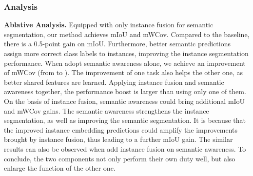 \documentclass[10pt,twocolumn,letterpaper]{article}
\newcommand{\myparagraph}[1]{{\vspace{0.5em} \noindent \bf #1}}
\begin{document}
\subsubsection{Analysis}
\label{subsubsec:ablation}
\myparagraph{Ablative Analysis.}
Equipped with only instance fusion for semantic segmentation, our method achieves  mIoU and  mWCov. Compared to the baseline, there is a 0.5-point gain on mIoU. 
Furthermore, better semantic predictions assign more correct class labels to instances, improving the instance segmentation performance.
When adopt semantic awareness alone, we achieve an improvement of  mWCov (from  to ). 
The improvement of one task also helps the other one, as better shared features are learned.  
Applying instance fusion and semantic awareness together, the performance boost is larger than using only one of them. 
On the basis of instance fusion, semantic awareness could bring additional  mIoU and  mWCov gains.
The semantic awareness strengthens the instance segmentation, as well as improving the semantic segmentation.
It is because that the improved instance embedding predictions could amplify the improvements brought by instance fusion, thus leading to a further  mIoU gain.
The similar results can also be observed when add instance fusion on semantic awareness.
To conclude, the two components not only perform their own duty well, but also enlarge the function of the other one.
\end{document}
